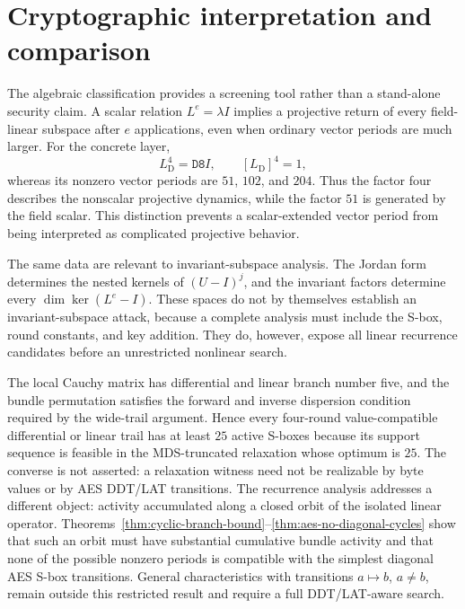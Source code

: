 \documentclass[10pt,reqno]{amsart}
\theoremstyle{plain}
\theoremstyle{remark}\newtheorem{remark}[theorem]{Remark}
\theoremstyle{definition}\newtheorem{definition}[theorem]{Definition}
\begin{document}
\section{Cryptographic interpretation and comparison}\label{sec:discussion}
The algebraic classification provides a screening tool rather than a stand-alone security claim. A scalar relation $L^e=\lambda I$ implies a projective return of every field-linear subspace after $e$ applications, even when ordinary vector periods are much larger. For the concrete layer,
\[
L_{\mathrm D}^4=\mathtt{D8}I,\qquad [L_{\mathrm D}]^4=1,
\]
whereas its nonzero vector periods are $51$, $102$, and $204$. Thus the factor four describes the nonscalar projective dynamics, while the factor $51$ is generated by the field scalar. This distinction prevents a scalar-extended vector period from being interpreted as complicated projective behavior.

The same data are relevant to invariant-subspace analysis. The Jordan form determines the nested kernels of $(U-I)^j$, and the invariant factors determine every $\dim\ker(L^e-I)$. These spaces do not by themselves establish an invariant-subspace attack, because a complete analysis must include the S-box, round constants, and key addition. They do, however, expose all linear recurrence candidates before an unrestricted nonlinear search.

The local Cauchy matrix has differential and linear branch number five, and the bundle permutation satisfies the forward and inverse dispersion condition required by the wide-trail argument. Hence every four-round value-compatible differential or linear trail has at least $25$ active S-boxes because its support sequence is feasible in the MDS-truncated relaxation whose optimum is $25$. The converse is not asserted: a relaxation witness need not be realizable by byte values or by AES DDT/LAT transitions. The recurrence analysis addresses a different object: activity accumulated along a closed orbit of the isolated linear operator. Theorems~\ref{thm:cyclic-branch-bound}--\ref{thm:aes-no-diagonal-cycles} show that such an orbit must have substantial cumulative bundle activity and that none of the possible nonzero periods is compatible with the simplest diagonal AES S-box transitions. General characteristics with transitions $a\mapsto b$, $a\ne b$, remain outside this restricted result and require a full DDT/LAT-aware search.
\end{document}
